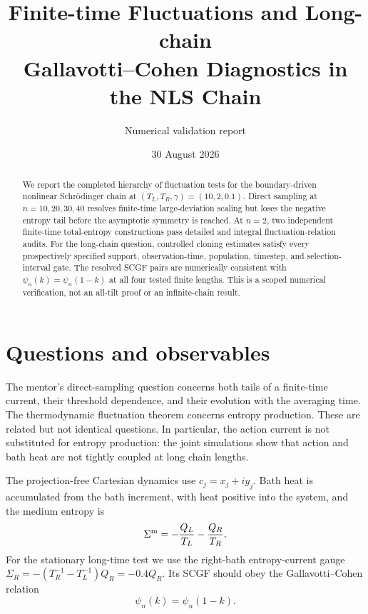 \documentclass[11pt]{article}
\title{Finite-time Fluctuations and Long-chain\\Gallavotti--Cohen Diagnostics in the NLS Chain}
\author{Numerical validation report}
\date{30 August 2026}
\begin{document}
\maketitle

\begin{abstract}
We report the completed hierarchy of fluctuation tests for the
boundary-driven nonlinear Schr\"odinger chain at
$(T_L,T_R,\gamma)=(10,2,0.1)$.  Direct sampling at
$n=10,20,30,40$ resolves finite-time large-deviation scaling but loses the
negative entropy tail before the asymptotic symmetry is reached.  At $n=2$,
two independent finite-time total-entropy constructions pass detailed and
integral fluctuation-relation audits.  For the long-chain question, controlled
cloning estimates satisfy every prospectively specified support,
observation-time, population, timestep, and selection-interval gate.  The
resolved SCGF pairs are numerically consistent with
$\psi_n(k)=\psi_n(1-k)$ at all four tested finite lengths.  This is a scoped
numerical verification, not an all-tilt proof or an infinite-chain result.
\end{abstract}

\section{Questions and observables}

The mentor's direct-sampling question concerns both tails of a finite-time
current, their threshold dependence, and their evolution with the averaging
time.  The thermodynamic fluctuation theorem concerns entropy production.
These are related but not identical questions.  In particular, the action
current is not substituted for entropy production: the joint simulations
show that action and bath heat are not tightly coupled at long chain lengths.

The projection-free Cartesian dynamics use $c_j=x_j+i y_j$.  Bath heat is
accumulated from the bath increment, with heat positive into the system, and
the medium entropy is
\begin{equation}
 \Sigma^{\rm m}=-\frac{Q_L}{T_L}-\frac{Q_R}{T_R}.
\end{equation}
For the stationary long-time test we use the right-bath entropy-current gauge
$\Sigma_R=-(T_R^{-1}-T_L^{-1})Q_R=-0.4Q_R$.  Its SCGF should obey the
Gallavotti--Cohen relation
\begin{equation}
 \psi_n(k)=\psi_n(1-k).
 \label{eq:gc}
\end{equation}
\end{document}
